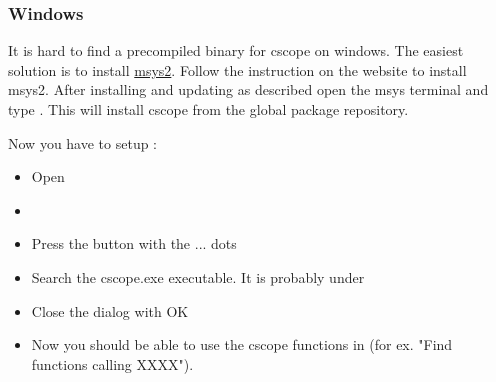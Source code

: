 \subsubsection{Windows}

It is hard to find a precompiled binary for cscope on windows. The easiest solution is to install \href{https://www.msys2.org/}{msys2}. Follow the instruction on the website \cite{url:msys2} to install msys2. After installing and updating as described open the msys terminal and type . This will install cscope from the global package repository.

Now you have to setup \codeblocks:

\begin{itemize}[noitemsep]
\item Open \codeblocks
\item {}
\item Press the button with the ... dots
\item Search the cscope.exe executable. It is probably under \newline
\item Close the dialog with OK
\item Now you should be able to use the cscope functions in \codeblocks (for ex. "Find functions calling XXXX").
\end{itemize}
